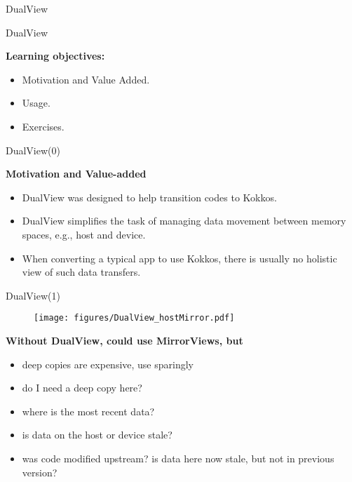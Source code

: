 
\begin{frame}[fragile]{DualView}

  {\Huge DualView}

  \vspace{20pt}

  \textbf{Learning objectives:}
  \begin{itemize}
    \item{Motivation and Value Added.}
    \item{Usage.}
    \item{Exercises.}
  \end{itemize}

\end{frame}


\begin{frame}[fragile]{DualView(0)}

  \textbf{Motivation and Value-added}

  \vspace{1em}

  \begin{itemize}
  \item{DualView was designed to help transition codes to Kokkos.}
  \pause
  \vspace{10pt}
  \item{DualView simplifies the task of managing data movement between memory spaces, e.g., host and device.}

  \pause
  \vspace{10pt}
  \item{When converting a typical app to use Kokkos, there is usually no holistic view of such data transfers.}
  \end{itemize}


\end{frame}

\begin{frame}[fragile]{DualView(1)}
\begin{figure}[h]
  \texttt{[image: figures/DualView\_hostMirror.pdf]}
\end{figure}

\textbf{Without DualView, could use MirrorViews, but}
  \begin{itemize}
    \item{deep copies are expensive, use sparingly}
    \item{do I need a deep copy here?}
    \item{where is the most recent data?}
    \item{is data on the host or device stale?}
    \item{was code modified upstream? is data here now stale, but not in previous version?}
  \end{itemize}

\end{frame}


